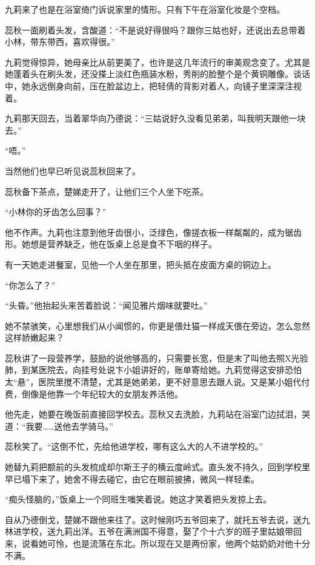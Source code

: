 \par 九莉来了也是在浴室倚门诉说家里的情形。只有下午在浴室化妆是个空档。
\par 蕊秋一面刷着头发，含酸道：“不是说好得很吗？跟你三姑也好，还说出去总带着小林，带东带西，喜欢得很。”
\par 九莉觉得惊异，她母亲比从前更美了，也许是这几年流行的审美观念变了。尤其是她蓬着头在刷头发，还没搽上淡红色瓶装水粉，秀削的脸整个是个黄铜雕像。谈话中，她永远倒身向前，压在脸盆边上，把轻倩的背影对着人，向镜子里深深注视着。
\par 九莉那天回去，当着翠华向乃德说：“三姑说好久没看见弟弟，叫我明天跟他一块去。”
\par “唔。”
\par 当然他们也早已听见说蕊秋回来了。
\par 蕊秋备下茶点，楚娣走开了，让他们三个人坐下吃茶。
\par “小林你的牙齿怎么回事？”
\par 他不作声。九莉也注意到他牙齿很小，泛绿色，像搓衣板一样粼粼的，成为锯齿形。她想是营养缺乏，他在饭桌上总是食不下咽的样子。
\par 有一天她走进餐室，见他一个人坐在那里，把头抵在皮面方桌的铜边上。
\par “你怎么了？”
\par “头昏。”他抬起头来苦着脸说：“闻见雅片烟味就要吐。”
\par 她不禁骇笑，心里想我们从小闻惯的，你更是偎灶猫一样成天偎在旁边，怎么忽然这样娇嫩起来？
\par 蕊秋讲了一段营养学，鼓励的说他够高的，只需要长宽，但是末了叫他去照X光验肺，到某医院去，向挂号处说卞小姐讲好的，账单寄给她。九莉觉得这安排恐怕太“悬”，医院里搅不清楚，尤其是她弟弟，更不好意思去跟人说。又是某小姐代付费，倒像是他靠一个年纪较大的女朋友养活他。
\par 他先走，她要在晚饭前直接回学校去。蕊秋又去洗脸，九莉站在浴室门边拭泪，哭道：“我要……送他去学骑马。”
\par 蕊秋笑了。“这倒不忙，先给他进学校，哪有这么大的人不进学校的。”
\par 她替九莉把额前的头发梳成却尔斯王子的横云度岭式。直头发不持久，回到学校里早已塌下来了，她舍不得去碰它，由它在眼前披拂，微风一样轻柔。
\par “痴头怪脑的，”饭桌上一个同班生嗤笑着说。她这才笑着把头发掠上去。
\par 自从乃德倒戈，楚娣不跟他来往了。这时候刚巧五爷回来了，就托五爷去说，送九林进学校，送九莉出洋。五爷在满洲国不得意，娶了个十六岁的班子里姑娘带回来，说看她可怜，也是流落在东北。所以现在又是两份家，他两个姑奶奶对他十分不满。
